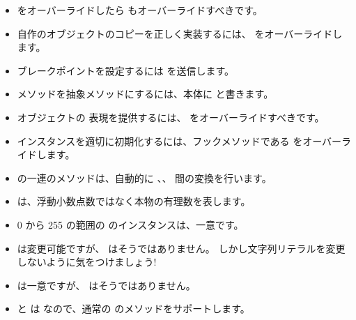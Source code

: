 \documentclass[a4paper,10pt,twoside]{book}
\begin{document}
\begin{itemize}

  \item \ct{=} をオーバーライドしたら  もオーバーライドすべきです。

  \item 自作のオブジェクトのコピーを正しく実装するには、 をオーバーライドします。

  \item ブレークポイントを設定するには  を送信します。

  \item メソッドを抽象メソッドにするには、本体に  と書きます。

  \item オブジェクトの  表現を提供するには、 をオーバーライドすべきです。

  \item インスタンスを適切に初期化するには、フックメソッドである  をオーバーライドします。

  \item {} の一連のメソッドは、自動的に 、、 間の変換を行います。

  \item {} は、浮動小数点数ではなく本物の有理数を表します。

  \item 0 から 255 の範囲の  のインスタンスは、一意です。

  \item {} は変更可能ですが、 はそうではありません。
  しかし文字列リテラルを変更しないように気をつけましょう!

  \item {} は一意ですが、 はそうではありません。

  \item {} と  は  なので、通常の  のメソッドをサポートします。

\end{itemize}

\ifx\wholebook\relax\else
   
   
\end{document}
